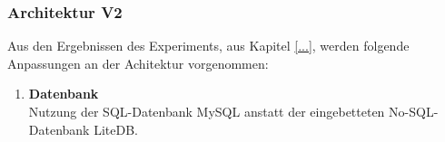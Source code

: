 \subsubsection{Architektur V2} \label{sec:Architektur}
    Aus den Ergebnissen des Experiments, aus Kapitel \ref{...}, werden folgende Anpassungen an der Achitektur vorgenommen:
    \begin{enumerate}
        \item \textbf{Datenbank} \\
            Nutzung der SQL-Datenbank MySQL anstatt der eingebetteten No-SQL-Datenbank LiteDB.
    \end{enumerate}
